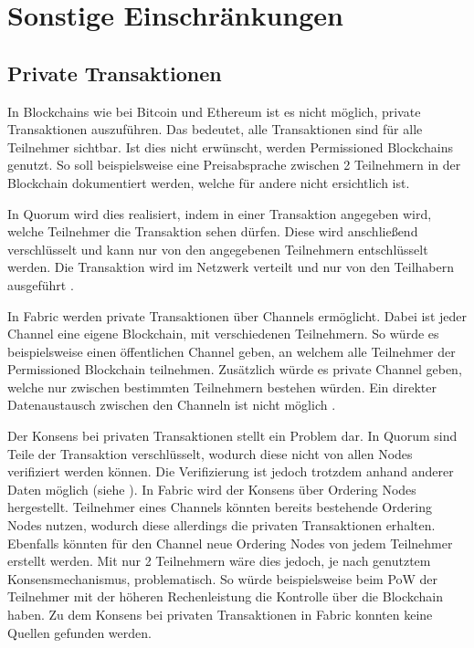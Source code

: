 \section{Sonstige Einschränkungen}

\subsection{Private Transaktionen}
In Blockchains wie bei Bitcoin und Ethereum ist es nicht möglich, private Transaktionen auszuführen. Das bedeutet, alle Transaktionen sind für alle Teilnehmer sichtbar. Ist dies nicht erwünscht, werden Permissioned Blockchains genutzt. So soll beispielsweise eine Preisabsprache zwischen 2 Teilnehmern in der Blockchain dokumentiert werden, welche für andere nicht ersichtlich ist.

In Quorum wird dies realisiert, indem in einer Transaktion angegeben wird, welche Teilnehmer die Transaktion sehen dürfen. Diese wird anschließend verschlüsselt und kann nur von den angegebenen Teilnehmern entschlüsselt werden. Die Transaktion wird im Netzwerk verteilt und nur von den Teilhabern ausgeführt \cite{QuorumTeamTransactionProcessingQuorum2018}.

In Fabric werden private Transaktionen über Channels ermöglicht. Dabei ist jeder Channel eine eigene Blockchain, mit verschiedenen Teilnehmern. So würde es beispielsweise einen öffentlichen Channel geben, an welchem alle Teilnehmer der Permissioned Blockchain teilnehmen. Zusätzlich würde es private Channel geben, welche nur zwischen bestimmten Teilnehmern bestehen würden. Ein direkter Datenaustausch zwischen den Channeln ist nicht möglich \cite{SchererPerformanceScalabilityBlockchain2017}. 

Der Konsens bei privaten Transaktionen stellt ein Problem dar. In Quorum sind Teile der Transaktion verschlüsselt, wodurch diese nicht von allen Nodes verifiziert werden können. Die Verifizierung ist jedoch trotzdem anhand anderer Daten möglich (siehe \cite{QuorumTeamQuorumChainConsensus2018}). In Fabric wird der Konsens über Ordering Nodes hergestellt. Teilnehmer eines Channels könnten bereits bestehende Ordering Nodes nutzen, wodurch diese allerdings die privaten Transaktionen erhalten. Ebenfalls könnten für den Channel neue Ordering Nodes von jedem Teilnehmer erstellt werden. Mit nur 2 Teilnehmern wäre dies jedoch, je nach genutztem Konsensmechanismus, problematisch. So würde beispielsweise beim \acs{PoW} der Teilnehmer mit der höheren Rechenleistung die Kontrolle über die Blockchain haben. Zu dem Konsens bei privaten Transaktionen in Fabric konnten keine Quellen gefunden werden.

